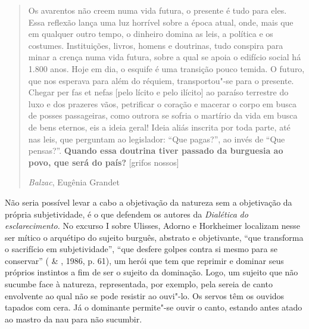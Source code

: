 \begin{quote}
Os avarentos não creem numa vida futura, o presente é tudo para eles.
Essa reflexão lança uma luz horrível sobre a época atual, onde, mais que
em qualquer outro tempo, o dinheiro domina as leis, a política e os
costumes. Instituições, livros, homens e doutrinas, tudo conspira para
minar a crença numa vida futura, sobre a qual se apoia o edifício social
há 1.800 anos. Hoje em dia, o esquife é uma transição pouco temida. O
futuro, que nos esperava para além do réquiem, transportou"-se para o
presente. Chegar per fas et nefas [pelo lícito e pelo ilícito] ao
paraíso terrestre do luxo e dos prazeres vãos, petrificar o coração e
macerar o corpo em busca de posses passageiras, como outrora se sofria o
martírio da vida em busca de bens eternos, eis a ideia geral! Ideia
aliás inscrita por toda parte, até nas leis, que perguntam ao
legislador: ``Que pagas?'', ao invés de ``Que pensas?''. \textbf{Quando
essa doutrina tiver passado da burguesia ao povo, que será do país?}
[grifos nossos]

\emph{Balzac}, Eugênia Grandet
\end{quote}

Não seria possível levar a cabo a objetivação da natureza sem a
objetivação da própria subjetividade, é o que defendem os autores da
\emph{Dialética} \emph{do} \emph{esclarecimento.} No excurso I sobre
Ulisses, Adorno e Horkheimer localizam nesse ser mítico o arquétipo do
sujeito burguês, abstrato e objetivante, ``que transforma o sacrifício
em subjetividade'', ``que desfere golpes contra si mesmo para se
conservar'' ( \& , 1986, p. 61), um herói que tem que
reprimir e dominar seus próprios instintos a fim de ser o sujeito da
dominação. Logo, um sujeito que não sucumbe face à natureza,
representada, por exemplo, pela sereia de canto envolvente ao qual não
se pode resistir ao ouvi"-lo. Os servos têm os ouvidos tapados com cera.
Já o dominante permite"-se ouvir o canto, estando antes atado ao mastro
da nau para não sucumbir.

